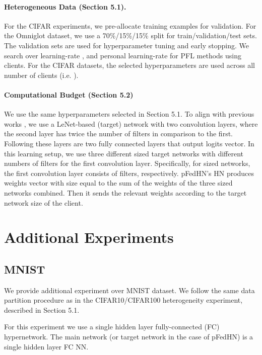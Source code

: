 \documentclass{article}
\newcommand\ourmethod{pFedHN}
\begin{document}
\paragraph{Heterogeneous Data (Section 5.1).} 
For the CIFAR experiments, we pre-allocate  training examples for validation. For the Omniglot dataset, we use a 70\%/15\%/15\% split for train/validation/test sets. 
The validation sets are used for hyperparameter tuning and early stopping. We search over learning-rate , and personal learning-rate  for PFL methods using  clients. For the CIFAR datasets, the selected hyperparameters are used across all number of clients (i.e. ). 

\paragraph{Computational Budget (Section 5.2)} We use the same hyperparameters selected in Section 5.1. To align with previous works \cite{Dinh2020PersonalizedFL, liang2020think, Fallah2020PersonalizedFL}, we use a LeNet-based (target) network with two convolution layers, where the second layer has twice the number of filters in comparison to the first. Following these layers are two fully connected layers that output logits vector. In this learning setup, we use three different sized target networks with different numbers of filters for the first convolution layer. Specifically, for  sized networks, the first convolution layer consists of  filters, respectively. \ourmethod{}'s HN produces weights vector with size equal to the sum of the weights of the three sized networks combined. Then it sends the relevant weights according to the target network size of the client.





\section{Additional Experiments}\label{app:additional_exp}

\subsection{MNIST} \label{app:mnist}

We provide additional experiment over MNIST dataset. We follow the same data partition procedure as in the CIFAR10/CIFAR100 heterogeneity experiment, described in Section 5.1.

For this experiment we use a single hidden layer fully-connected (FC) hypernetwork. The main network (or target network in the case of \ourmethod{}) is a single hidden layer FC NN.
\end{document}
